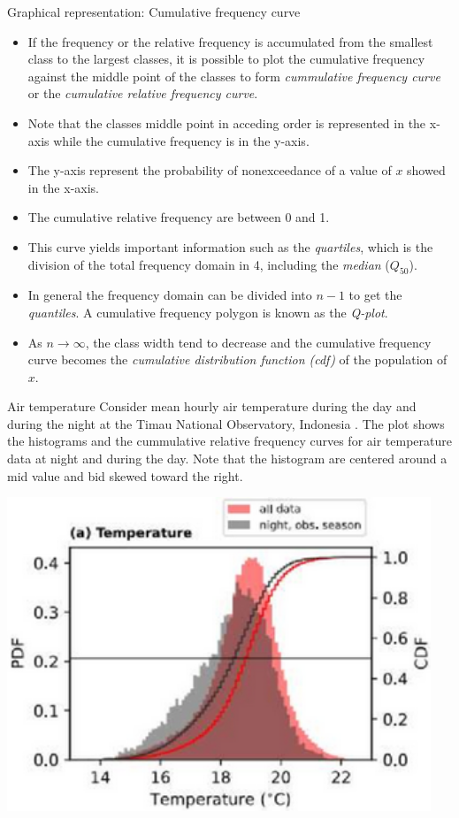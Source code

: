 \documentclass[8pt]{beamer}
\begin{document}
\begin{frame}{Graphical representation: Cumulative frequency curve}
    \begin{itemize}
        \item If the frequency or the relative frequency is accumulated from the smallest class to the largest classes, it is possible to plot the cumulative frequency against the middle point of the classes to form \emph{cummulative frequency curve} or the \emph{cumulative relative frequency curve}. 
        \item Note that the classes middle point in acceding order is represented in the x-axis while the cumulative frequency is in the y-axis. 
        \item The  y-axis represent the probability of nonexceedance of a value of $x$ showed in the x-axis. 
        \item The cumulative relative frequency are between 0 and 1. 
        \item This curve yields important information such as the \emph{quartiles}, which is the division of the total frequency domain in 4, including the \emph{median} ($Q_{50}$). 
        \item In general the frequency domain can be divided into $n-1$ to get the \emph{quantiles}. A cumulative frequency polygon is known as the \emph{Q-plot}. 
        \item As $n \to \infty$, the class width tend to decrease and the cumulative frequency curve becomes the \emph{cumulative distribution function (cdf)} of the population of $x$. 
    \end{itemize}
    \begin{minipage}{0.495\textwidth}
    \begin{exampleblock}{Air temperature}
        Consider mean hourly air temperature during the day and during the night at the Timau National Observatory, Indonesia \citep{priyatikanto2024weather}. The plot shows the histograms and the cummulative relative frequency curves for air temperature data at night and during the day. Note that the histogram are centered around a mid value and bid skewed toward the right. 
    \end{exampleblock}
\end{minipage}
\hfill
\begin{minipage}{0.495\textwidth}
    \includegraphics[width=0.95\textwidth]{fie2.png}

\end{minipage}
\end{frame}
\end{document}
